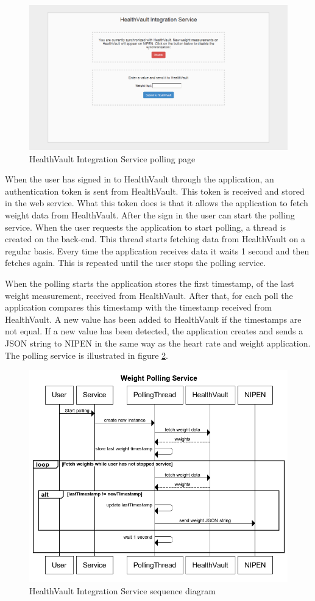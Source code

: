 \begin{figure}[H]
\centering
\includegraphics[scale=0.4]{../Figures/webservice-polling.png}
\caption{HealthVault Integration Service polling page}
\label{figure:webservice-polling}
\end{figure}

When the user has signed in to HealthVault through the application, an authentication token is sent from HealthVault.
This token is received and stored in the web service.
What this token does is that it allows the application to fetch weight data from HealthVault.
After the sign in the user can start the polling service.
When the user requests the application to start polling, a thread is created on the back-end.
This thread starts fetching data from HealthVault on a regular basis.
Every time the application receives data it waits 1 second and then fetches again.
This is repeated until the user stops the polling service.

When the polling starts the application stores the first timestamp, of the last weight measurement, received from HealthVault.
After that, for each poll the application compares this timestamp with the timestamp received from HealthVault.
A new value has been added to HealthVault if the timestamps are not equal.
If a new value has been detected, the application creates and sends a JSON string to NIPEN in the same way as the heart rate and weight application.
The polling service is illustrated in figure \ref{figure:weight-polling-service}.

\begin{figure}[h]
\centering
\includegraphics[scale=0.8]{../Figures/weight-polling-service.png}
\caption{HealthVault Integration Service sequence diagram}
\label{figure:weight-polling-service}
\end{figure}
